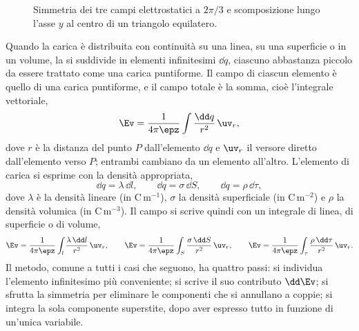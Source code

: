\documentclass[main.tex]{subfiles}
\begin{document}
\begin{figure}[htbp]
  \caption{Simmetria dei tre campi elettrostatici a $2\pi/3$ e scomposizione lungo l'asse $y$ al centro di un triangolo equilatero.}
  \label{fig:campo:campo_triangolo_infografica}
\end{figure}

Quando la carica è distribuita con continuità su una linea, su una superficie o in un volume, la si suddivide in elementi infinitesimi $\dd q$, ciascuno abbastanza piccolo da essere trattato come una carica puntiforme. Il campo di ciascun elemento è quello di una carica puntiforme, e il campo totale è la somma, cioè l'integrale vettoriale,
\[
\Ev=\frac{1}{4\pi\epz}\int \frac{\dd q}{r^2}\,\uv_r ,
\]
dove $r$ è la distanza del punto $P$ dall'elemento $\dd q$ e $\uv_r$ il versore diretto dall'elemento verso $P$; entrambi cambiano da un elemento all'altro. L'elemento di carica si esprime con la densità appropriata,
\[
\dd q=\lambda\,\dd l, \qquad \dd q=\sigma\,\dd S, \qquad \dd q=\rho\,\dd\tau ,
\]
dove $\lambda$ è la densità lineare (in $\mathrm{C\,m^{-1}}$), $\sigma$ la densità superficiale (in $\mathrm{C\,m^{-2}}$) e $\rho$ la densità volumica (in $\mathrm{C\,m^{-3}}$). Il campo si scrive quindi con un integrale di linea, di superficie o di volume,
\[
\Ev=\frac{1}{4\pi\epz}\int_l\frac{\lambda\,\dd l}{r^2}\,\uv_r,\qquad
\Ev=\frac{1}{4\pi\epz}\int_S\frac{\sigma\,\dd S}{r^2}\,\uv_r,\qquad
\Ev=\frac{1}{4\pi\epz}\int_\tau\frac{\rho\,\dd\tau}{r^2}\,\uv_r .
\]
Il metodo, comune a tutti i casi che seguono, ha quattro passi: si individua l'elemento infinitesimo più conveniente; si scrive il suo contributo $\dd\Ev$; si sfrutta la simmetria per eliminare le componenti che si annullano a coppie; si integra la sola componente superstite, dopo aver espresso tutto in funzione di un'unica variabile.
\end{document}
